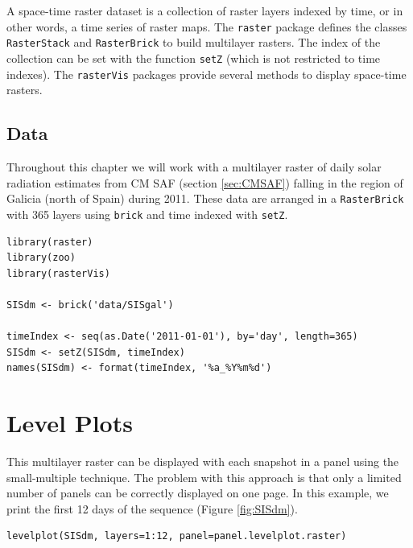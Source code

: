 \documentclass[smallroyalvopaper]{memoir}
\begin{document}
A space-time raster dataset is a collection of raster layers indexed
by time, or in other words, a time series of raster maps. The \texttt{raster}
package defines the classes \texttt{RasterStack} and \texttt{RasterBrick} to build
multilayer rasters. The index of the collection can be set with the
function \texttt{setZ} (which is not restricted to time indexes). The
\texttt{rasterVis} packages provide several methods to display space-time
rasters.

\subsection{Data}
\label{sec-1-1}
Throughout this chapter we will work with a multilayer raster of daily
solar radiation estimates from CM SAF (section \ref{sec:CMSAF}) falling in
the region of Galicia (north of Spain) during 2011. These data are
arranged in a \texttt{RasterBrick} with 365 layers using \texttt{brick} and time
indexed with \texttt{setZ}.


\lstset{language=R,numbers=none}
\begin{lstlisting}
library(raster)
library(zoo)
library(rasterVis)

SISdm <- brick('data/SISgal')

timeIndex <- seq(as.Date('2011-01-01'), by='day', length=365)
SISdm <- setZ(SISdm, timeIndex)
names(SISdm) <- format(timeIndex, '%a_%Y%m%d')
\end{lstlisting}
\section{Level Plots}
\label{sec-2}

This multilayer raster can be displayed with each snapshot in a
panel using the small-multiple technique. The problem with this
approach is that only a limited number of panels can be correctly
displayed on one page. In this example, we print the first 12
days of the sequence (Figure \ref{fig:SISdm}).


\lstset{language=R,numbers=none}
\begin{lstlisting}
levelplot(SISdm, layers=1:12, panel=panel.levelplot.raster)
\end{lstlisting}
\end{document}
